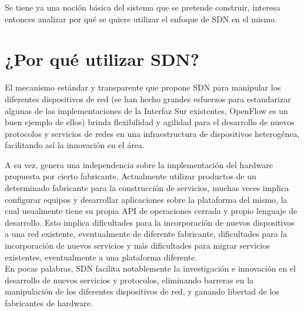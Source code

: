Se tiene ya una noción básica del sistema que se pretende construir, interesa entonces analizar por qu\'e se quiere utilizar el enfoque de SDN en el mismo.
  
\section[¿Por qu\'e utilizar SDN?]{¿Por qu\'e utilizar SDN?}


El mecanismo estándar y transparente que propone SDN para manipular los diferentes dispositivos de red  
 (se han hecho grandes esfuerzos para estandarizar algunas de las implementaciones de la Interfaz Sur existentes, OpenFlow es un buen ejemplo de ellos) brinda flexibilidad y agilidad para el desarrollo de nuevos protocolos y servicios de redes en una infraestructura de dispositivos heterogénea, facilitando as\'i la innovaci\'on en el \'area. 

A su vez, genera una independencia sobre la implementaci\'on del hardware propuesta por cierto fabricante. Actualmente utilizar productos de un determinado fabricante para la construcci\'on de servicios, muchas veces implica configurar equipos y desarrollar aplicaciones sobre la plataforma del mismo, la cual usualmente tiene su propia API de operaciones cerrada y propio lenguaje de desarrollo. Esto implica dificultades para la incorporaci\'on de nuevos dispositivos a una red existente, eventualmente de diferente fabricante, dificultades para la incorporaci\'on de nuevos servicios y m\'as dificultades para migrar servicios existentes, eventualmente a una plataforma diferente.\\

En pocas palabras, SDN facilita notablemente la investigaci\'on e innovaci\'on en el desarrollo de nuevos servicios y protocolos, eliminando barreras en la manipulaci\'on de los diferentes dispositivos de red, y ganando libertad de los fabricantes de hardware.\\





